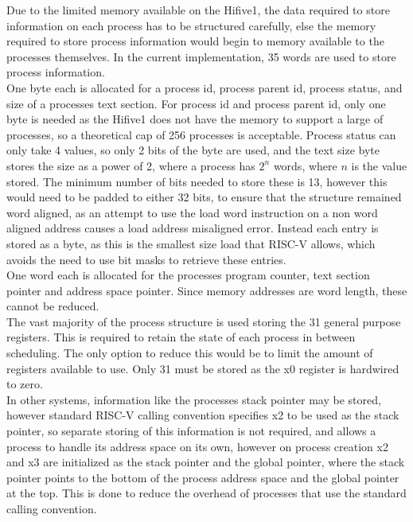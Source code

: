 Due to the limited memory available on the Hifive1, the data required to store information on each process has to be structured carefully, else the memory required to store process information would begin to memory available to the processes themselves. In the current implementation, 35 words are used to store process information.
\\
One byte each is allocated for a process id, process parent id, process status, and size of a processes text section. For process id and process parent id, only one byte is needed as the Hifive1 does not have the memory to support a large of processes, so a theoretical cap of 256 processes is acceptable. Process status can only take 4 values, so only 2 bits of the byte are used, and the text size byte stores the size as a power of 2, where a process has \(2^n\) words, where \(n\) is the value stored. The minimum number of bits needed to store these is 13, however this would need to be padded to either 32 bits, to ensure that the structure remained word aligned, as an attempt to use the load word instruction on a non word aligned address causes a load address misaligned error. Instead each entry is stored as a byte, as this is the smallest size load that RISC-V allows, which avoids the need to use bit masks to retrieve these entries.
\\
One word each is allocated for the processes program counter, text section pointer and address space pointer. Since memory addresses are word length, these cannot be reduced.
\\
The vast majority of the process structure is used storing the 31 general purpose registers. This is required to retain the state of each process in between scheduling. The only option to reduce this would be to limit the amount of registers available to use. Only 31 must be stored as the x0 register is hardwired to zero.
\\
In other systems, information like the processes stack pointer may be stored, however standard RISC-V calling convention specifies x2 to be used as the stack pointer, so separate storing of this information is not required, and allows a process to handle its address space on its own, however on process creation x2 and x3 are initialized as the stack pointer and the global pointer, where the stack pointer points to the bottom of the process address space and the global pointer at the top. This is done to reduce the overhead of processes that use the standard calling convention.
